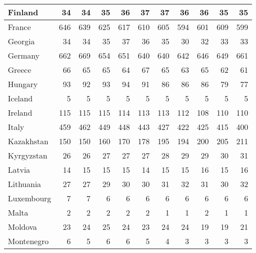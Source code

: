 \begin{table}
\begin{tabular}{|l|r|r|r|r|r|r|r|r|r|r|}
                       Finland&     34&     34&     35&     36&     37&     37&     36&     36&     35&     35\\\hline
                        France&    646&    639&    625&    617&    610&    605&    594&    601&    609&    599\\\hline
                       Georgia&     34&     34&     35&     37&     36&     35&     30&     32&     33&     33\\\hline
                       Germany&    662&    669&    654&    651&    640&    640&    642&    646&    649&    661\\\hline
                        Greece&     66&     65&     65&     64&     67&     65&     63&     65&     62&     61\\\hline
                       Hungary&     93&     92&     93&     94&     91&     86&     86&     86&     79&     77\\\hline
                       Iceland&      5&      5&      5&      5&      5&      5&      5&      5&      5&      5\\\hline
                       Ireland&    115&    115&    115&    114&    113&    113&    112&    108&    110&    110\\\hline
                         Italy&    459&    462&    449&    448&    443&    427&    422&    425&    415&    400\\\hline
                    Kazakhstan&    150&    150&    160&    170&    178&    195&    194&    200&    205&    211\\\hline
                    Kyrgyzstan&     26&     26&     27&     27&     27&     28&     29&     29&     30&     31\\\hline
                        Latvia&     14&     15&     15&     15&     14&     15&     15&     16&     15&     16\\\hline
                     Lithuania&     27&     27&     29&     30&     30&     31&     32&     31&     30&     32\\\hline
                    Luxembourg&      7&      7&      6&      6&      6&      6&      6&      6&      6&      6\\\hline
                         Malta&      2&      2&      2&      2&      2&      1&      1&      2&      1&      1\\\hline
                       Moldova&     23&     24&     25&     24&     23&     24&     24&     19&     19&     21\\\hline
                    Montenegro&      6&      5&      6&      6&      5&      4&      3&      3&      3&      3\\\hline

\end{tabular}
\end{table}

